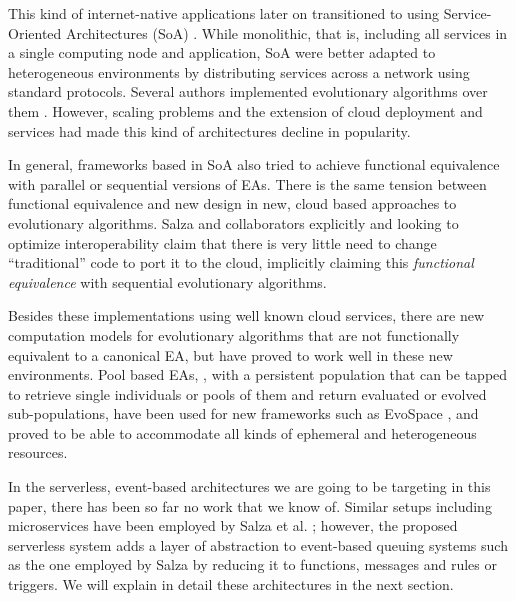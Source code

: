 \documentclass{llncs}
\begin{document}
  This kind of internet-native applications later on transitioned to
  using Service-Oriented Architectures (SoA) \cite{Papazoglou2007}. While monolithic, that is,
  including all services in a single computing node and application, SoA
  were better adapted to heterogeneous environments by distributing
  services across a network using standard protocols. Several authors
  implemented evolutionary algorithms over them
  \cite{garcia2013service,munawar2010design,6955331}. However, scaling
  problems and the extension of cloud deployment and services had made
  this kind of architectures decline in popularity.

  In general, frameworks based in SoA also tried to achieve functional equivalence with parallel
  or sequential versions of EAs. There is the same tension between
  functional equivalence and new
  design in new, cloud based approaches to evolutionary
  algorithms. 
  Salza and collaborators \cite{salza2017ccube,de2017parallel} explicitly
  and looking to optimize interoperability claim that there is very
  little need to change ``traditional'' code to port it to the cloud,
  implicitly claiming this {\em functional equivalence} with
  sequential evolutionary algorithms.

  Besides these implementations using well known cloud services, there are new computation models for evolutionary algorithms
  that are not functionally equivalent to a canonical EA, but have
  proved to work well in these new environments. Pool based EAs,
  \cite{bollini1999distributed}, with a persistent population that can
  be tapped to retrieve single individuals or pools of them and return
  evaluated or evolved sub-populations, have been used for new
  frameworks such as EvoSpace \cite{García-Valdez2015}, and proved to be
  able to accommodate all kinds of ephemeral and heterogeneous
  resources.

  In the serverless, event-based architectures we are going to
  be targeting in this paper, there has been so far no work that we know
  of. Similar setups including microservices have been employed by Salza et
  al. \cite{salza2017ccube}; however, the proposed serverless system adds a layer of abstraction to event-based queuing systems such as the one employed
  by Salza by reducing it to functions, messages and rules or
  triggers. We will explain in detail these architectures in the next
  section.
\end{document}
